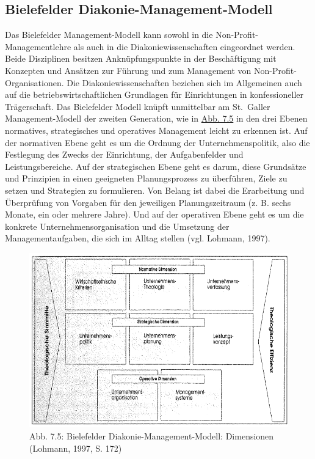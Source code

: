 \documentclass[
  letterpaper,
]{book}
\begin{document}
\subsection{Bielefelder
Diakonie-Management-Modell}\label{bielefelder-diakonie-management-modell}

Das Bielefelder Management-Modell kann sowohl in die
Non-Profit-Managementlehre als auch in die Diakoniewissenschaften
eingeordnet werden. Beide Disziplinen besitzen Anknüpfungspunkte in der
Beschäftigung mit Konzepten und Ansätzen zur Führung und zum Management
von Non-Profit-Organisationen. Die Diakoniewissenschaften beziehen sich
im Allgemeinen auch auf die betriebswirtschaftlichen Grundlagen für
Einrichtungen in konfessioneller Trägerschaft. Das Bielefelder Modell
knüpft unmittelbar am St.~Galler Management-Modell der zweiten
Generation, wie in \hyperref[figure75]{Abb. 7.5} in den drei Ebenen
normatives, strategisches und operatives Management leicht zu erkennen
ist. Auf der normativen Ebene geht es um die Ordnung der
Unternehmenspolitik, also die Festlegung des Zwecks der Einrichtung, der
Aufgabenfelder und Leistungsbereiche. Auf der strategischen Ebene geht
es darum, diese Grundsätze und Prinzipien in einen geeigneten
Planungsprozess zu überführen, Ziele zu setzen und Strategien zu
formulieren. Von Belang ist dabei die Erarbeitung und Überprüfung von
Vorgaben für den jeweiligen Planungszeitraum (z. B. sechs Monate, ein
oder mehrere Jahre). Und auf der operativen Ebene geht es um die
konkrete Unternehmensorganisation und die Umsetzung der
Managementaufgaben, die sich im Alltag stellen (vgl. Lohmann, 1997).

\begin{figure}

\includegraphics[width=0.75\linewidth,height=\textheight,keepaspectratio]{images/figure75.png} \hfill{}

\caption{Abb. 7.5: Bielefelder Diakonie-Management-Modell: Dimensionen
(Lohmann, 1997, S. 172)}

\end{figure}%
\end{document}
